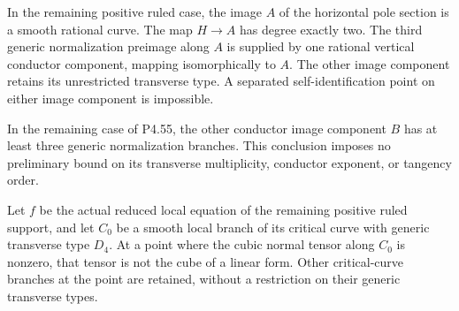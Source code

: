 
\begin{proposition}[P4.55]\hypertarget{tag-02XU}{}\label{night:P4.55}\label{stmt:P4.55}


In the remaining positive ruled case, the image $A$ of the
horizontal pole section is a smooth rational curve. The map
$H\to A$ has degree exactly two. The third generic
normalization preimage along $A$ is supplied by one rational
vertical conductor component, mapping isomorphically to $A$.
The other image component retains its unrestricted transverse
type. A separated self-identification point on either image
component is impossible.
\end{proposition}

\begin{proposition}[P4.56]\hypertarget{tag-02XV}{}\label{night:P4.56}\label{stmt:P4.56}


In the remaining case of P4.55, the other conductor image
component $B$ has at least three generic normalization
branches. This conclusion imposes no preliminary bound on
its transverse multiplicity, conductor exponent, or tangency
order.
\end{proposition}

\begin{proposition}[P4R.19]\hypertarget{tag-02YC}{}\label{night:P4R.19}\label{stmt:P4R.19}


Let $f$ be the actual reduced local equation of the remaining
positive ruled support, and let $C_0$ be a smooth local branch
of its critical curve with generic transverse type $D_4$.
At a point where the cubic normal tensor along $C_0$ is
nonzero, that tensor is not the cube of a linear form.
Other critical-curve branches at the point are retained,
without a restriction on their generic transverse types.
\end{proposition}

